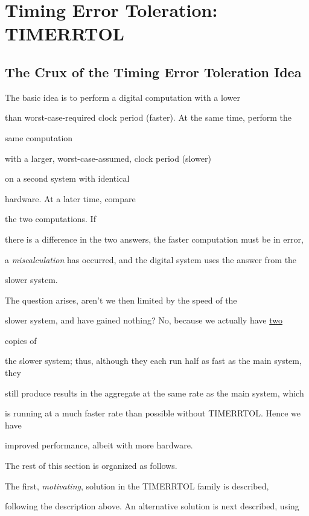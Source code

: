 \documentclass[12pt,dvips]{article}
\begin{document}
\section{Timing Error Toleration: TIMERRTOL}

\label{timerrtolsec}



\subsection{The Crux of the Timing Error Toleration Idea}

The basic idea is to perform a digital computation with a lower

than worst-case-required clock period (faster). At the same time, perform the

same computation

with a larger, worst-case-assumed, clock period (slower)

on a second system with identical

hardware. At a later time, compare

the two computations. If

there is a difference in the two answers, the faster computation must be in error,

a {\it miscalculation} has occurred, and the digital system uses the answer from the

slower system.



The question arises, aren't we then limited by the speed of the

slower system, and have gained nothing? No, because we actually have \underline{two}

copies of

the slower system; thus, although they each run half as fast as the main system, they

still produce results in the aggregate at the same rate as the main system, which

is running at a much faster rate than possible without TIMERRTOL. Hence we have

improved performance, albeit with more hardware.



The rest of this section is organized as follows. 

The first, {\it motivating}, solution in the TIMERRTOL family is described,

following the description above. An alternative solution is next described, using
\end{document}

